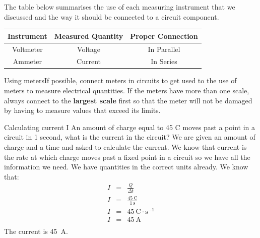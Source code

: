 
The table below summarises the use of each measuring instrument
that we discussed and the way it should be connected to a circuit
component.

\begin{center}
\begin{tabular}{ | c | c | c | }
\hline 
\textbf{Instrument} & \textbf{Measured Quantity} & \textbf{Proper Connection} \\ \hline \hline 
Voltmeter & Voltage & In Parallel \\ \hline Ammeter &
Current & In Series \\ \hline
\hline
\end{tabular}
\end{center}


\begin{activity}{Using meters}If possible, 
connect meters in circuits to get used to the use of meters to
measure electrical quantities. If the meters have more than one
scale, always connect to the \textbf{largest scale} first so that the meter
will not be damaged by having to measure values that exceed its
limits.
\end{activity}



\begin{wex}{Calculating current I}
{An amount of charge equal to 45 C moves past a point in a circuit in 1 second, what is the current in the circuit?
}{%
We are given an amount of charge and a time and asked to calculate the current. We know that current is the rate at which charge moves past a fixed point in a circuit so we have all the information we need. We have quantities in the correct units already.
We know that:
\begin{eqnarray*}
I &=& \frac{Q}{\Delta t} \\
I &=& \frac{45~\text{C}}{1~\text{s}} \\
I &=& 45~\text{C} \cdot \text{s}^{-1} \\
I &=& 45~\text{A} \\
\end{eqnarray*}
The current is 45~A.
}
\end{wex}


